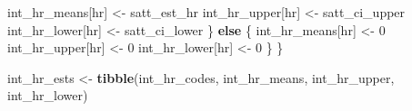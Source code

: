 \documentclass[
  12pt,
]{article}
\newenvironment{Shaded}{\begin{snugshade}}{\end{snugshade}}
\newcommand{\ControlFlowTok}[1]{\textcolor[rgb]{0.13,0.29,0.53}{\textbf{#1}}}
\newcommand{\DecValTok}[1]{\textcolor[rgb]{0.00,0.00,0.81}{#1}}
\newcommand{\FunctionTok}[1]{\textcolor[rgb]{0.13,0.29,0.53}{\textbf{#1}}}
\newcommand{\NormalTok}[1]{#1}
\newcommand{\OtherTok}[1]{\textcolor[rgb]{0.56,0.35,0.01}{#1}}
\begin{document}
\begin{Shaded}
\begin{Highlighting}[]
\NormalTok{    int\_hr\_means[hr] }\OtherTok{\textless{}{-}}\NormalTok{ satt\_est\_hr}
\NormalTok{    int\_hr\_upper[hr] }\OtherTok{\textless{}{-}}\NormalTok{ satt\_ci\_upper}
\NormalTok{    int\_hr\_lower[hr] }\OtherTok{\textless{}{-}}\NormalTok{ satt\_ci\_lower}
\NormalTok{  \}}
  \ControlFlowTok{else}\NormalTok{ \{}
\NormalTok{    int\_hr\_means[hr] }\OtherTok{\textless{}{-}} \DecValTok{0}
\NormalTok{    int\_hr\_upper[hr] }\OtherTok{\textless{}{-}} \DecValTok{0}
\NormalTok{    int\_hr\_lower[hr] }\OtherTok{\textless{}{-}} \DecValTok{0}
\NormalTok{  \}}
\NormalTok{\}}

\NormalTok{int\_hr\_ests }\OtherTok{\textless{}{-}} \FunctionTok{tibble}\NormalTok{(int\_hr\_codes, int\_hr\_means, int\_hr\_upper, int\_hr\_lower)}
\end{Highlighting}
\end{Shaded}
\end{document}

